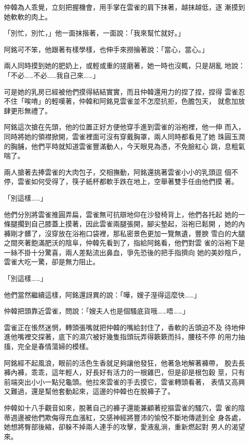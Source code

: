仲韓為人乖覺，立刻把握機會，用手掌在雲雀的肩下抹著，越抹越低，逐
漸摸到她軟軟的肉上。

「別忙，別忙，」他一面抹揩著，一面說：「我來幫忙就好。」

阿銘可不笨，他跟著有樣學樣，也伸手來撈掄著說：「當心，當心。」

兩人同時摸到她的肥奶上，或輕或重的搓磨著，她一時也沒輒，只是胡亂
地說：「不必……不必……我自己來……」

可是她的乳房已經被他們摸得結結實實，而且仲韓還用力的捏了捏，捏得
雲雀忍不住「唉唷」的輕嘆著，仲韓和阿銘見雲雀並不怎麼抗拒，色膽包天，
就愈加放肆更形無禮了。

阿銘這次搶在先頭，他的位置正好方便他穿手進到雲雀的浴袍裡，他一伸
而入，同時將她的領襟掀開，雲雀裡面可沒有穿戴胸罩，兩人同時都看見了她
珠圓玉潤的胸脯，他們平時就知道雲雀豐滿動人，今天眼見為憑，不免臉紅心
跳，息粗氣喘了。

兩人搶著去捧雲雀的大肉包子，交相撫動，阿銘還挑著雲雀小小的乳頭逗
個不停，雲雀如何受得了，筷子紙杯都軟手跌在地上，空舉著雙手任由他們摸
著。

「別這樣……」

他們分別將雲雀推圓弄扁，雲雀無可抗辯地仰在沙發椅背上，他們各托起
她的一條腿擱到自己膝蓋上摸著，因此雲雀兩腿張開，腳尖墊起，浴袍已鬆開
，她的內褲剛才髒了，沒穿放在浴袍口袋裡，那私密景色更加一覽無遺，豐腴
雪白的大腿之間夾著飽滿肥沃的陰阜，仲韓先看到了，指給阿銘看，他們對雲
雀的浴袍下是一絲不掛十分驚喜，兩人差點流出鼻血，爭先恐後的把手指擠向
她的美妙陰戶，雲雀大吃一驚，卻是無力阻止。

「別這樣……」

他們當然繼續這樣，阿銘還訝異的說：「嘩，嫂子溼得這麼快……」

仲韓把頭靠近雲雀，問說：「嫂夫人也是個騷底貨哦……唔……」

雲雀正在悵然迷惘，轉頭張嘴就把仲韓的嘴給封住了，香軟的舌頭迫不及
待地伸進他嘴裡交探著，底下的濕穴被好幾隻指頭玩弄得簌簌而抖，腰枝不停
的用力抽搐，完全是春情蕩婦的模樣。

阿銘經不起風浪，眼前的活色生香就足夠讓他發狂，他著急地解著褲帶，
脫去長褲內褲，乖乖，這年輕人，好長好有活力的一根雞巴，但是卻是根包穀
莖，只有前端突出小小一點兒龜頭。他拉來雲雀的手去摸它，雲雀轉頭看著，
表情又高興又難過，還是幫他套動起來，這邊的仲韓也在脫褲子了。

仲韓如十八手觀音如來，脫著自己的褲子還能兼顧著挖摳雲雀的騷穴，雲
雀的陰蒂週邊被他們欺侮得充血漲紅，交感神經將豐沛的愉悅不斷地傳遞到全
身各處，她想將臀部後縮，卻躲不掉兩人連手的攻擊，愛液亂淌，重新燃起對
男人的渴望來。


